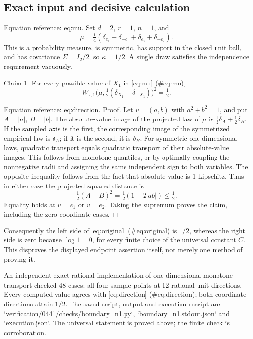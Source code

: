 \documentclass[10pt]{article}
\begin{document}
\subsection*{Exact input and decisive calculation}
Equation reference: eq:mu. Set \(d=2\), \(r=1\), \(n=1\), and \[
 \mu=\tfrac14(\delta_{e_1}+\delta_{-e_1}
                  +\delta_{e_2}+\delta_{-e_2}).\] This is a probability measure, is symmetric, has support in the closed unit ball, and has covariance \(\Sigma=I_2/2\), so \(\kappa=1/2\). A single draw satisfies the independence requirement vacuously.\par
Claim 1.  For every possible value of \(X_1\) in [eq:mu] (\#eq:mu), \[W_{2,1}\bigl(\mu,\tfrac12(\delta_{X_1}+\delta_{-X_1})\bigr)^2
 =\tfrac12 .\]\par
Equation reference: eq:direction. Proof. Let \(v=(a,b)\) with \(a^2+b^2=1\), and put \(A=|a|\), \(B=|b|\). The absolute-value image of the projected law of \(\mu\) is \(\tfrac12\delta_A+\tfrac12\delta_B\). If the sampled axis is the first, the corresponding image of the symmetrized empirical law is \(\delta_A\); if it is the second, it is \(\delta_B\). For symmetric one-dimensional laws, quadratic transport equals quadratic transport of their absolute-value images. This follows from monotone quantiles, or by optimally coupling the nonnegative radii and assigning the same independent sign to both variables. The opposite inequality follows from the fact that absolute value is 1-Lipschitz. Thus in either case the projected squared distance is \[
 \tfrac12(A-B)^2=\tfrac12(1-2|ab|)\leq\tfrac12.\] Equality holds at \(v=e_1\) or \(v=e_2\). Taking the supremum proves the claim, including the zero-coordinate cases. ◻\par
Consequently the left side of [eq:original] (\#eq:original) is \(1/2\), whereas the right side is zero because \(\log1=0\), for every finite choice of the universal constant \(C\). This disproves the displayed endpoint assertion itself, not merely one method of proving it.\par
An independent exact-rational implementation of one-dimensional monotone transport checked 48 cases: all four sample points at 12 rational unit directions. Every computed value agrees with [eq:direction] (\#eq:direction); both coordinate directions attain \(1/2\). The saved script, output and execution receipt are `verification/0441/checks/boundary\_n1.py`, `boundary\_n1.stdout.json` and `execution.json`. The universal statement is proved above; the finite check is corroboration.\par
\end{document}
